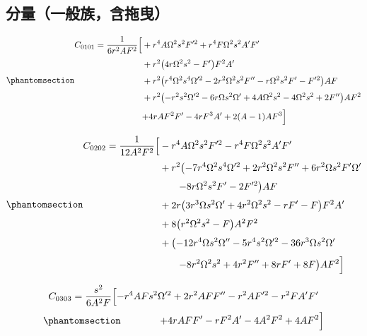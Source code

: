 \documentclass[
  chinese,
  a4paper,
  UTF8,
  12pt,
  oneside,
  openany]{ctexbook}
\theoremstyle{plain}
\theoremstyle{plain}
\theoremstyle{plain}
\theoremstyle{definition}
\theoremstyle{plain}
\theoremstyle{plain}
\theoremstyle{remark}
\begin{document}
\subsection{分量（一般族，含拖曳）}\label{ux5206ux91cfux4e00ux822cux65cfux542bux62d6ux66f3}

\begin{equation}\protect\phantomsection\label{eq-isg2-C0101}{
\begin{aligned}
C_{0101}=\frac{1}{6r^{2}AF^{2}}\Bigl[
&+r^{4}A\Omega^{2}s^{2}F'^{2}+r^{4}F\Omega^{2}s^{2}A'F'\Bigr.\\[3pt]
&+r^{2}\bigl(4r\Omega^{2}s^{2}-F'\bigr)F^{2}A'\\[3pt]
&+r^{2}\bigl(r^{4}\Omega^{2}s^{4}\Omega'^{2}-2r^{2}\Omega^{2}s^{2}F''-r\Omega^{2}s^{2}F'-F'^{2}\bigr)AF\\[3pt]
&+r^{2}\bigl(-r^{2}s^{2}\Omega'^{2}-6r\Omega s^{2}\Omega'+4A\Omega^{2}s^{2}-4\Omega^{2}s^{2}+2F''\bigr)AF^{2}\\[3pt]
&\Bigl.+4rAF^{2}F'-4rF^{3}A'+2(A-1)AF^{3}\Bigr]
\end{aligned}
}\end{equation}

\begin{equation}\protect\phantomsection\label{eq-isg2-C0202}{
\begin{aligned}
C_{0202}=\frac{1}{12A^{2}F^{2}}\Bigl[
&-r^{4}A\Omega^{2}s^{2}F'^{2}-r^{4}F\Omega^{2}s^{2}A'F'\Bigr.\\[3pt]
&+r^{2}\bigl(-7r^{4}\Omega^{2}s^{4}\Omega'^{2}+2r^{2}\Omega^{2}s^{2}F''+6r^{2}\Omega s^{2}F'\Omega'\bigr.\\[3pt]
&\qquad\bigl.-8r\Omega^{2}s^{2}F'-2F'^{2}\bigr)AF\\[3pt]
&+2r\bigl(3r^{3}\Omega s^{2}\Omega'+4r^{2}\Omega^{2}s^{2}-rF'-F\bigr)F^{2}A'\\[3pt]
&+8\bigl(r^{2}\Omega^{2}s^{2}-F\bigr)A^{2}F^{2}\\[3pt]
&+\bigl(-12r^{4}\Omega s^{2}\Omega''-5r^{4}s^{2}\Omega'^{2}-36r^{3}\Omega s^{2}\Omega'\bigr.\\[3pt]
&\qquad\Bigl.-8r^{2}\Omega^{2}s^{2}+4r^{2}F''+8rF'+8F\bigr)AF^{2}\Bigr]
\end{aligned}
}\end{equation}

\[
C_{0303}=\frac{s^{2}}{6A^{2}F}\Bigl[
-r^{4}AFs^{2}\Omega'^{2}+2r^{2}AFF''-r^{2}A F'^{2}-r^{2}F A'F'
\] \begin{equation}\protect\phantomsection\label{eq-isg2-C0303}{
\qquad\qquad +4rAFF'-rF^{2}A'-4A^{2}F^{2}+4AF^{2}\Bigr]
}\end{equation}
\end{document}
